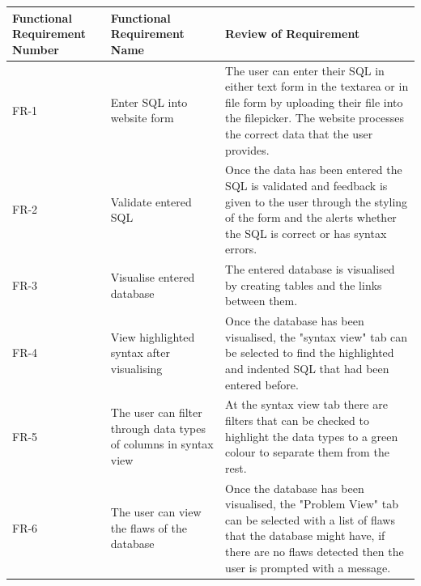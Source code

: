 \begin{center}
	\setlength\extrarowheight{2pt}
	\begin{tabularx}{\textwidth}{|X|X|X|}
		\hline
		\textbf{Functional Requirement Number} & \textbf{Functional Requirement Name} & \textbf{Review of Requirement} \\
		\hline
		FR-1 &  Enter SQL into website form & The user can enter their SQL in either text form in the textarea or in file form by uploading their file into the filepicker. The website processes the correct data that the user provides. \\
		\hline
		FR-2 & Validate entered SQL & Once the data has been entered the SQL is validated and feedback is given to the user through the styling of the form and the alerts whether the SQL is correct or has syntax errors. \\
		\hline
		FR-3 & Visualise entered database & The entered database is visualised by creating tables and the links between them.\\
		\hline
		FR-4 & View highlighted syntax after visualising & Once the database has been visualised, the "syntax view" tab can be selected to find the highlighted and indented SQL that had been entered before. \\
		\hline
		FR-5 & The user can filter through data types of columns in syntax view & At the syntax view tab there are filters that can be checked to highlight the data types to a green colour to separate them from the rest. \\
		\hline
		FR-6 & The user can view the flaws of the database & Once the database has been visualised, the "Problem View" tab can be selected with a list of flaws that the database might have, if there are no flaws detected then the user is prompted with a message. \\
		\hline
	\end{tabularx}
\end{center}